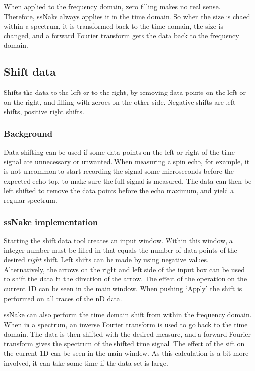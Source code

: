 \documentclass[11pt,a4paper]{article}
\begin{document}
When applied to the frequency domain, zero filling makes no real sense. Therefore, ssNake always applies it in the time domain. So when the size is chaed within a spectrum, it is transformed back to the time domain, the size is changed, and a forward Fourier transform gets the data back to the frequency domain.

\subsection{Shift data}
Shifts the data to the left or to the right, by removing data points on the left or on the right, and filling with zeroes on the other side. Negative shifts are left shifts, positive right shifts.

\subsubsection*{Background}
Data shifting can be used if some data points on the left or right of the time signal are unnecessary or unwanted. When measuring a spin echo, for example, it is not uncommon to start recording the signal some microseconds before the expected echo top, to make sure the full signal is measured. The data can then be left shifted to remove the data points before the echo maximum, and yield a regular spectrum.

\subsubsection*{ssNake implementation}
Starting the shift data tool creates an input window. Within this window, a integer number must be filled in that equals the number of data points of the  desired \textit{right} shift. Left shifts can be made by using negative values. Alternatively, the arrows on the right and left side of the input box can be used to shift the data in the direction of the arrow. The effect of the operation on the current 1D can be seen in the main window. When pushing `Apply' the shift is performed on all traces of the nD data.

ssNake can also perform the time domain shift from within the frequency domain. When in a spectrum, an inverse Fourier transform is used to go back to the time domain. The data is then shifted with the desired measure, and a forward Fourier transform gives the spectrum of the shifted time signal. The effect of the sift on the current 1D can be seen in the main window. As this calculation is a bit more involved, it can take some time if the data set is large.
\end{document}
